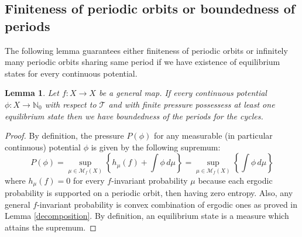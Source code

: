 \documentclass[12 pt]{amsart}
\newtheorem{lemma}[theorem]{Lemma}
\theoremstyle{definition}
\begin{document}
	\subsection{Finiteness of periodic orbits or boundedness of periods}
	The following lemma guarantees either finiteness of periodic orbits or infinitely many periodic orbits sharing same period if we have existence of equilibrium states for every continuous potential.
	\begin{lemma}\label{finiteness}
		Let $f: X \to X$ be a general map. If every continuous potential $\phi : X \to \mathbb{N}_{0}$ with respect to $\mathcal{T}$ and with finite pressure possessess at least one equilibrium state then we have boundedness of the periods for the cycles.
	\end{lemma}
	\begin{proof}
		By definition, the pressure $P(\phi)$ for any measurable (in particular continuous) potential $\phi$ is given by the following supremum:
		\begin{equation}
			P(\phi) = \sup_{\mu \in \mathcal{M}_{f}(X)} \left\{ h_\mu(f) + \int \phi \, d\mu \right\} = \sup_{\mu \in \mathcal{M}_{f}(X)} \left\{ \int \phi \, d\mu \right\}
		\end{equation}
		where $h_{\mu}(f) = 0$ for every $f$-invariant probability $\mu$ because each ergodic probability is supported on a periodic orbit, then having zero entropy. Also, any general $f$-invariant probability is convex combination of ergodic ones as proved in Lemma \ref{decomposition}. By definition, an equilibrium state is a measure which attains the supremum.
		

\end{proof}
\end{document}
